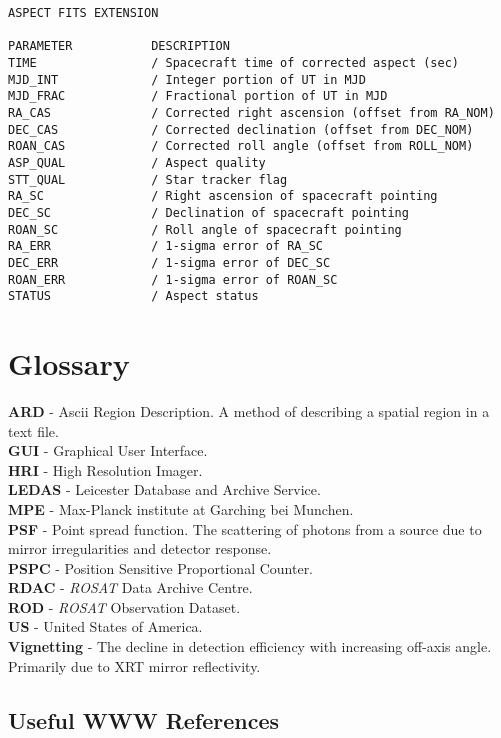 \documentclass[11pt,fleqn]{article}    %
\begin{document}
\begin{verbatim}
ASPECT FITS EXTENSION

PARAMETER           DESCRIPTION
TIME                / Spacecraft time of corrected aspect (sec)      
MJD_INT             / Integer portion of UT in MJD     
MJD_FRAC            / Fractional portion of UT in MJD    
RA_CAS              / Corrected right ascension (offset from RA_NOM)   
DEC_CAS             / Corrected declination (offset from DEC_NOM) 
ROAN_CAS            / Corrected roll angle (offset from ROLL_NOM) 
ASP_QUAL            / Aspect quality      
STT_QUAL            / Star tracker flag  
RA_SC               / Right ascension of spacecraft pointing       
DEC_SC              / Declination of spacecraft pointing      
ROAN_SC             / Roll angle of spacecraft pointing     
RA_ERR              / 1-sigma error of RA_SC  
DEC_ERR             / 1-sigma error of DEC_SC   
ROAN_ERR            / 1-sigma error of ROAN_SC    
STATUS              / Aspect status     
\end{verbatim}

\newpage
\section{Glossary}
{\large\bf ARD} - Ascii Region Description. A method of describing
a spatial region in a text file. \\
{\large\bf GUI} - Graphical User Interface.\\
{\large\bf HRI} - High Resolution Imager. \\
{\large\bf LEDAS} - Leicester Database and Archive Service. \\
{\large\bf MPE} - Max-Planck institute at Garching bei Munchen. \\
{\large\bf PSF} - Point spread function. The scattering of photons
from a source due to mirror irregularities and detector response. \\
{\large\bf PSPC} - Position Sensitive Proportional Counter. \\
{\large\bf RDAC} - {\em ROSAT} Data Archive Centre. \\
{\large\bf ROD} - {\em ROSAT} Observation Dataset. \\
{\large\bf US} - United States of America. \\
{\large\bf Vignetting} - The decline in detection efficiency with 
increasing off-axis angle. Primarily due to XRT mirror reflectivity. \\

\subsection{Useful WWW References}
\end{document}
